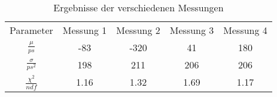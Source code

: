 \begin{table}[H]
  \caption{Ergebnisse der verschiedenen Messungen}
  \centering
  \begin{tabular}{|c|c|c|c|c|}
    \hline
    Parameter & Messung 1 & Messung 2 & Messung 3 & Messung 4 \\
    $\frac{\mu}{ps}$ & -83 & -320 & 41 & 180 \\
    $\frac{\sigma}{ps^2}$ & 198 & 211 & 206 & 206 \\
    $\frac{\chi^2}{ndf}$& 1.16 & 1.32 & 1.69 & 1.17\\
  \end{tabular}
\end{table}
